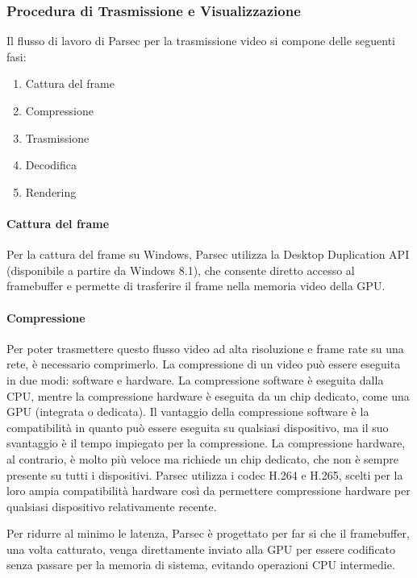 \documentclass[12pt,a4paper,openright,twoside]{book}
\begin{document}
\subsubsection{Procedura di Trasmissione e Visualizzazione}

Il flusso di lavoro di Parsec per la trasmissione video si compone delle seguenti fasi:
\begin{enumerate}
    \item Cattura del frame
    \item Compressione
    \item Trasmissione
    \item Decodifica
    \item Rendering
\end{enumerate}

\paragraph{Cattura del frame}
Per la cattura del frame su Windows, Parsec utilizza la Desktop Duplication API (disponibile a partire da Windows 8.1),
che consente diretto accesso al framebuffer e permette di trasferire il frame nella memoria video della GPU.

\paragraph{Compressione}
\label{sec:compressione}
Per poter trasmettere questo flusso video ad alta risoluzione e frame rate su una rete, è necessario comprimerlo.
La compressione di un video può essere eseguita in due modi: software e hardware.
%
La compressione software è eseguita dalla CPU, mentre la compressione hardware è eseguita da un chip dedicato, come una GPU (integrata o dedicata).
%
Il vantaggio della compressione software è la compatibilità in quanto può essere eseguita su qualsiasi dispositivo, ma il suo svantaggio è il tempo impiegato per la compressione.
La compressione hardware, al contrario, è molto più veloce ma richiede un chip dedicato, che non è sempre presente su tutti i dispositivi.
%
Parsec utilizza i codec H.264 e H.265, scelti per la loro ampia compatibilità hardware così da permettere compressione hardware per qualsiasi dispositivo relativamente recente.

Per ridurre al minimo le latenza, Parsec è progettato per far si che il framebuffer,
una volta catturato, venga direttamente inviato alla GPU per essere codificato senza passare per la memoria di sistema, evitando operazioni CPU intermedie.
\end{document}
